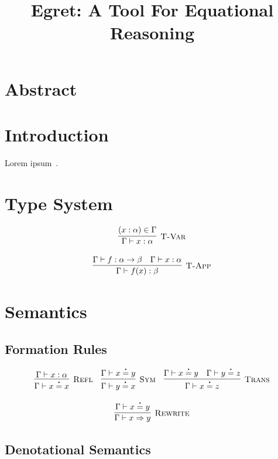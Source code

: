 \documentclass[runningheads]{llncs}
\begin{document}
\title{Egret: A Tool For Equational Reasoning}
\maketitle

\section{Abstract}

\section{Introduction}

Lorem ipsum~\cite{Elliott-2018-ad-extended}.

\section{Type System}
\[
  \begin{array}{c}
    \labinfer[T-Var]{\Gamma \vdash x : \alpha}{(x : \alpha) \in \Gamma}
    \\\\
    \labinfer[T-App]{\Gamma \vdash f(x) : \beta}{\Gamma \vdash f : \alpha \ra \beta & \Gamma \vdash x : \alpha}
  \end{array}
\]

\section{Semantics}

\subsection{Formation Rules}
\[
  \begin{array}{c}
    \labinfer[Refl]{\Gamma \vdash x \eq x}{\Gamma \vdash x : \alpha}
    ~~~
    \labinfer[Sym]{\Gamma \vdash y \eq x}{\Gamma \vdash x \eq y}
    ~~~
    \labinfer[Trans]{\Gamma \vdash x \eq z}{\Gamma \vdash x \eq y & \Gamma \vdash y \eq z}
    \\\\
    \labinfer[Rewrite]{\Gamma \vdash x \rewrite y}{\Gamma \vdash x \eq y}
  \end{array}
\]

\subsection{Denotational Semantics}
\end{document}
